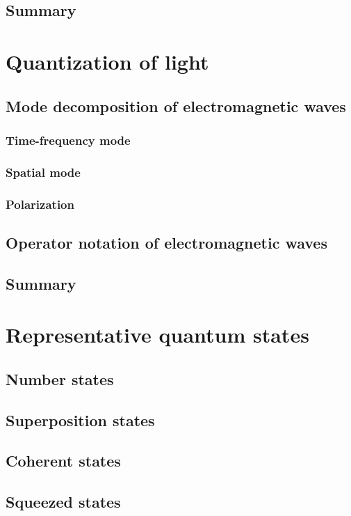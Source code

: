 \documentclass{book}
\begin{document}
\section{Summary}




\chapter{Quantization of light}
\section{Mode decomposition of electromagnetic waves}
\subsection{Time-frequency mode}
\subsection{Spatial mode}
\subsection{Polarization}
\section{Operator notation of electromagnetic waves}
\section{Summary}

\chapter{Representative quantum states}
\section{Number states}
\section{Superposition states}
\section{Coherent states}
\section{Squeezed states}
\end{document}
